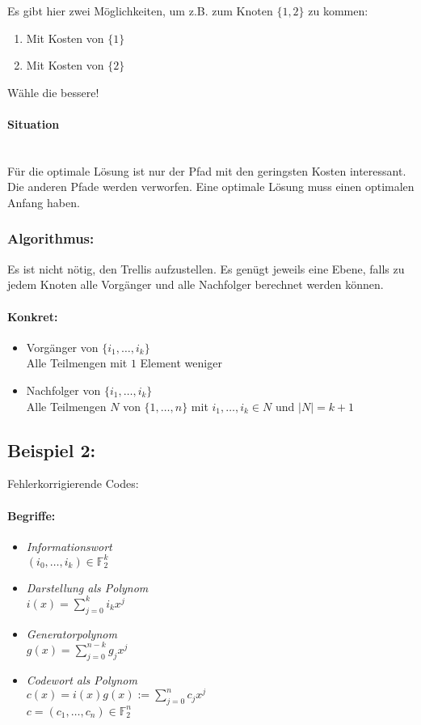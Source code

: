 \documentclass[a4paper,twoside,DIV15,BCOR12mm]{scrbook}
\begin{document}
Es gibt hier zwei Möglichkeiten, um z.B. zum Knoten $\{1,2\}$ zu kommen:
\begin{enumerate}
\item Mit Kosten von $\{1\}$
\item Mit Kosten von $\{2\}$
\end{enumerate}
Wähle die bessere!
\paragraph{Situation} \\
Für die optimale Lösung ist nur der Pfad mit den geringsten Kosten interessant. Die anderen Pfade werden verworfen. Eine optimale Lösung muss einen optimalen Anfang haben.
\subsubsection{Algorithmus:}
Es ist nicht nötig, den Trellis aufzustellen. Es genügt jeweils eine Ebene, falls zu jedem Knoten alle Vorgänger und alle Nachfolger berechnet werden können.
\paragraph{Konkret:}
\begin{itemize}
\item Vorgänger von $\{i_1,\ldots ,i_k\}$\\
Alle Teilmengen mit $1$ Element weniger
\item Nachfolger von $\{i_1,\ldots ,i_k\}$\\
Alle Teilmengen $N$ von $\{1,\ldots ,n\}$ mit $i_1,\ldots ,i_k\in N$ und $|N|=k+1$
\end{itemize}

\subsection{Beispiel 2:} 
Fehlerkorrigierende Codes:
\paragraph{Begriffe:}
\begin{itemize}
\item \em{Informationswort}\\
$(i_0,\ldots,i_k)\in \mathbb{F}_2^k$
\item \em{Darstellung als Polynom}\\
$i(x)=\sum_{j=0}^k i_k x^j$
\item \em{Generatorpolynom}\\
$g(x)=\sum_{j=0}^{n-k} g_j x^j$
\item \em{Codewort als Polynom}\\
$c(x)=i(x) g(x) := \sum_{j=0}^n c_j x^j$\\
$c=(c_1,\ldots,c_n) \in \mathbb{F}_2^n$
\end{itemize}
\end{document}
